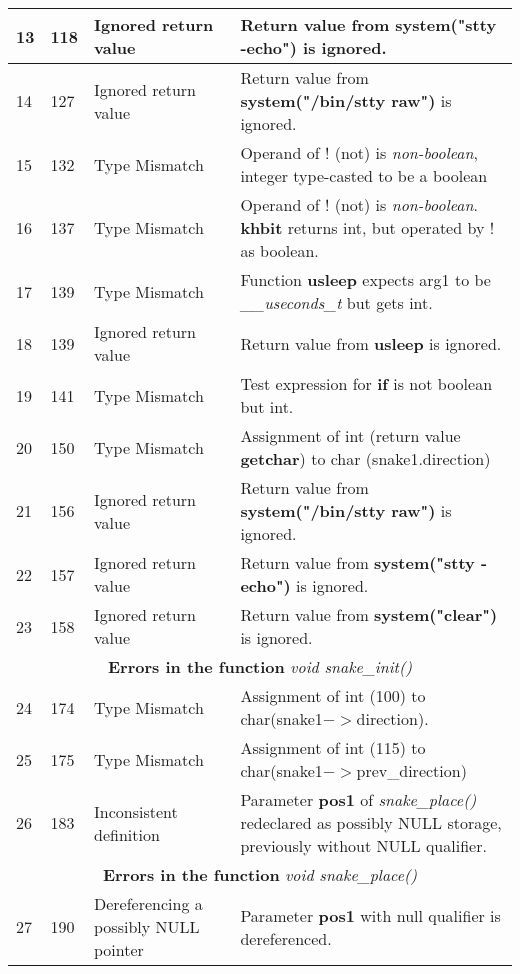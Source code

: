 \documentclass[]{article}
\begin{document}
\begin{longtable}{ |p{0.5cm}|p{0.75cm}|p{3cm}|p{9cm}|  }
		\hline 
		13 & 118 & Ignored return value & Return value from \textbf{system("stty -echo")} is ignored.\\ 
		\hline 
		14 & 127 & Ignored return value & Return value from \textbf{system("/bin/stty raw")} is ignored.\\
		\hline 
		15 & 132 & Type Mismatch & Operand of ! (not) is \textit{non-boolean}, integer type-casted to be a boolean \\
		\hline
		16 & 137 & Type Mismatch & Operand of ! (not) is \textit{non-boolean}. \textbf{khbit} returns int, but operated by ! as boolean. \\
		\hline 
		17 & 139 & Type Mismatch & Function \textbf{usleep} expects arg1 to be \textit{\_\_useconds\_t} but gets int. \\
		\hline 
		18 & 139 & Ignored return value & Return value from \textbf{usleep} is ignored. \\
		\hline 
		19 & 141 & Type Mismatch & Test expression for \textbf{if} is not boolean but int. \\ 
		\hline 
		20 & 150 & Type Mismatch & Assignment of int (return value \textbf{getchar}) to char (snake1.direction) \\
		\hline 
		21 & 156 & Ignored return value & Return value from \textbf{system("/bin/stty raw")} is ignored. \\
		\hline 
		22 & 157 & Ignored return value & Return value from \textbf{system("stty -echo")} is ignored. \\
		\hline 
		23 & 158 & Ignored return value & Return value from \textbf{system("clear")} is ignored. \\
		\hline 
		\multicolumn{4}{|c|}{\textbf{Errors in the function} \textit{void snake\_init()}} \\
		\hline 
		24 & 174 & Type Mismatch & Assignment of int (100) to char(snake1$->$direction). \\
		\hline 
		25 & 175 & Type Mismatch & Assignment of int (115) to char(snake1$->$prev\_direction) \\
		\hline 
		26 & 183 & Inconsistent definition & Parameter \textbf{pos1} of \textit{snake\_place()} redeclared as possibly NULL storage, previously without NULL qualifier. \\
		\hline 
		\multicolumn{4}{|c|}{\textbf{Errors in the function} \textit{void snake\_place()}} \\
		\hline 
		27 & 190 & Dereferencing a possibly NULL pointer & Parameter \textbf{pos1} with null qualifier is dereferenced. \\

\end{longtable}
\end{document}
